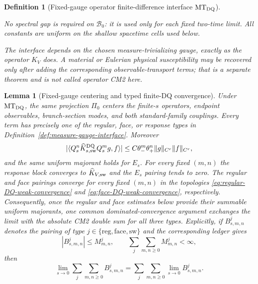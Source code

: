 \documentclass[11pt]{article}
\newtheorem{lemma}[theorem]{Lemma}
\newtheorem{definition}[theorem]{Definition}
\newcommand{\cB}{\mathcal B}
\begin{document}
\begin{definition}[Fixed-gauge operator finite-difference interface
$\mathrm{MT}_{\rm DQ}$]
\begin{enumerate}[label=\textup{(MT\arabic*)}]
      No spectral gap is required on $\cB_0$: it is used only for each fixed
      two-time limit.  All constants are uniform on the shallow spacetime
      cells used below.
\end{enumerate}
The interface depends on the chosen measure-trivializing gauge, exactly as
the operator $K_V$ does.  A material or Eulerian physical susceptibility may
be recovered only after adding the corresponding observable-transport terms;
that is a separate theorem and is not called operator CM2 here.
\end{definition}

\begin{lemma}[Fixed-gauge centering and typed finite-DQ convergence]
\label{lem:fixed-gauge-centering}
Under $\mathrm{MT}_{\rm DQ}$, the same projection $\Pi_0$ centers the
finite-$s$ operators, endpoint observables, branch-section modes, and both
standard-family couplings.  Every term has precisely one of the regular,
face, or response types in
Definition~\ref{def:measure-gauge-interface}.  Moreover
\begin{equation}
\label{eq:derived-strong-weak-CM2}
 |\langle Q_s^n\widehat K_{s,\rm sw}^{\rm DQ}Q_s^mg,f\rangle|
 \le C\theta_-^m\theta_+^n\|g\|_{C^r}\|f\|_{C^r},
\end{equation}
and the same uniform majorant holds for $E_s$.  For every fixed $(m,n)$ the
response block converges to $\widehat K_{V,\rm sw}$ and the $E_s$ pairing
tends to zero.  The regular and face pairings converge for every fixed
$(m,n)$ in the topologies
\eqref{eq:regular-DQ-weak-convergence} and
\eqref{eq:face-DQ-weak-convergence}, respectively.  Consequently, once the
regular and face estimates below provide their summable uniform majorants,
one common dominated-convergence argument exchanges the limit with the
absolute CM2 double sum for all three types.  Explicitly, if
$B_{s,m,n}^{j}$ denotes the pairing of type
$j\in\{\mathrm{reg},\mathrm{face},\mathrm{sw}\}$ and the corresponding
ledger gives
\begin{equation}
\label{eq:typed-common-dominated-convergence}
 |B_{s,m,n}^{j}|\le M_{m,n}^{j},\qquad
 \sum_{j}\sum_{m,n\ge0}M_{m,n}^{j}<\infty,
\end{equation}
then
\[
 \lim_{s\to0}\sum_j\sum_{m,n\ge0}B_{s,m,n}^{j}
 =\sum_j\sum_{m,n\ge0}\lim_{s\to0}B_{s,m,n}^{j}.
\]
\end{lemma}
\end{document}
